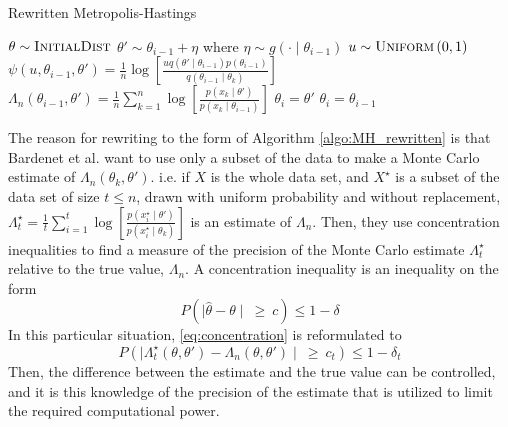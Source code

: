 \documentclass{article}
\theoremstyle{definition}
\begin{document}
\begin{algorithm}[H] 
    \caption{Rewritten Metropolis-Hastings}
    \label{algo:MH_rewritten}
    \begin{algorithmic}[1] %
        \State $\theta \sim \textsc{InitialDist}$ 
        \State$\theta' \sim \theta_{i-1} + \eta$ where $\eta\sim g\left(\cdot \mid \theta_{i-1}\right)$
        \State $u\sim \textsc{Uniform}\left(0,1\right)$
        \State $\psi\left(u, \theta_{i-1}, \theta'\right) = \frac{1}{n} \log\left[\frac{u q\left(\theta'\mid \theta_{i-1} \right) p \left(\theta_{i-1}\right)}{q\left(\theta_{i-1} \mid \theta_k \right)} \right]$
        \State $\Lambda_n \left(\theta_{i-1}, \theta'\right) = \frac{1}{n} \sum_{k = 1}^n \log \left[\frac{p\left(x_{k}\mid \theta'\right)}{p\left(x_{k}\mid \theta_{i-1}\right)}\right]$
        \State $\theta_i = \theta'$
        \Else 
        \State $\theta_i = \theta_{i-1}$
         \EndIf
         \EndFor
    \end{algorithmic}
\end{algorithm}
The reason for rewriting to the form of Algorithm \ref{algo:MH_rewritten} is that Bardenet et al. want to use only a subset of the data to make a Monte Carlo estimate of $\Lambda_n\left(\theta_k, \theta'\right)$.  i.e. if $X$ is the whole data set, and $X^{\star}$ is a subset of the data set of size $t\leq n$, drawn with uniform probability and without replacement, $\Lambda^{\star}_t = \frac{1}{t} \sum_{i = 1}^t \log\left[\frac{p\left(x_i^{\star}\mid \theta'\right)}{p\left(x_i^{\star}\mid \theta_k\right)}\right]$ is an estimate of $\Lambda_n$.  Then, they use concentration inequalities to find a measure of the precision of the Monte Carlo estimate $\Lambda_t^{\star}$ relative to the true value,  $\Lambda_n$. A concentration inequality is an inequality on the form 
\begin{equation}\label{eq:concentration}
    P\left(\mid \hat{\theta} - \theta \mid \:\geq \:c\right) \leq 1 - \delta 
\end{equation}
In this particular situation, \eqref{eq:concentration} is reformulated to 
\begin{equation*}
    P\left(\mid\Lambda_t^{\star}\left(\theta, \theta'\right) - \Lambda_n\left(\theta, \theta'\right)\mid \: \geq \:c_t \right) \leq 1 - \delta_t  
\end{equation*}{}
Then, the difference between the estimate and the true value can be controlled, and it is this knowledge of the precision of the estimate that is utilized to limit the required computational power.
\end{document}
